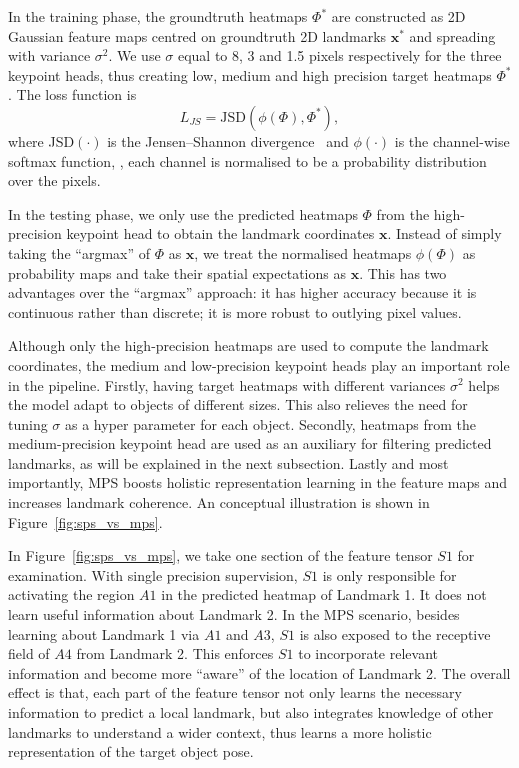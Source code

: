 \documentclass[10pt,twocolumn,letterpaper]{article}
\newcommand{\bx}{\bm{x}}
\begin{document}
In the training phase, the groundtruth heatmaps $\Phi^*$ are constructed as 2D Gaussian feature maps centred on groundtruth 2D landmarks $\bx^*$ and spreading with variance $\sigma^2$. We use $\sigma$ equal to 8, 3 and 1.5 pixels respectively for the three keypoint heads, thus creating low, medium and high precision target heatmaps $\Phi^*$. The loss function is
\begin{equation}
    L_{JS} = \text{JSD}(\phi(\Phi), \Phi^*),
\end{equation}
where JSD$(\cdot)$ is the Jensen–Shannon divergence~\cite{Fuglede2004jensen} and $\phi(\cdot)$ is the channel-wise softmax function, \ie, each channel is normalised to be a probability distribution over the pixels. 

In the testing phase, we only use the predicted heatmaps $\Phi$ from the high-precision keypoint head to obtain the landmark coordinates $\bx$. Instead of simply taking the ``argmax'' of $\Phi$ as $\bx$, we treat the normalised heatmaps $\phi(\Phi)$ as probability maps and take their spatial expectations as $\bx$. This has two advantages over the ``argmax'' approach: it has higher accuracy because it is continuous rather than discrete; it is more robust to outlying pixel values. 

Although only the high-precision heatmaps are used to compute the landmark coordinates, the medium and low-precision keypoint heads play an important role in the pipeline. Firstly, having target heatmaps with different variances $\sigma^2$ helps the model adapt to objects of different sizes. This also relieves the need for tuning $\sigma$ as a hyper parameter for each object. Secondly, heatmaps from the medium-precision keypoint head are used as an auxiliary for filtering predicted landmarks, as will be explained in the next subsection. Lastly and most importantly, MPS boosts holistic representation learning in the feature maps and increases landmark coherence. An conceptual illustration is shown in Figure~\ref{fig:sps_vs_mps}. 

In Figure~\ref{fig:sps_vs_mps}, we take one section of the feature tensor $S1$ for examination. With single precision supervision, $S1$ is only responsible for activating the region $A1$ in the predicted heatmap of Landmark 1. It does not learn useful information about Landmark 2. In the MPS scenario, besides learning about Landmark 1 via $A1$ and $A3$, $S1$ is also exposed to the receptive field of $A4$ from Landmark 2. This enforces $S1$ to incorporate relevant information and become more ``aware'' of the location of Landmark 2. The overall effect is that, each part of the feature tensor not only learns the necessary information to predict a local landmark, but also integrates knowledge of other landmarks to understand a wider context, thus learns a more holistic representation of the target object pose. 
\end{document}
